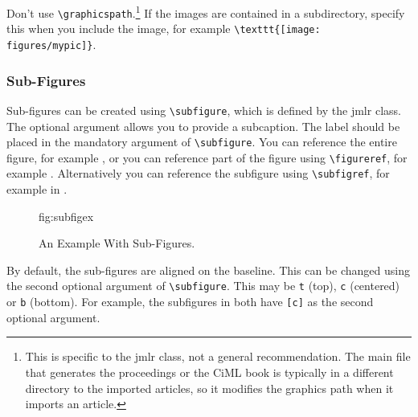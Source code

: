 \documentclass[pmlr,twocolumn,10pt]{jmlr} %
\begin{document}
Don't use \verb|\graphicspath|.\footnote{This is specific to the
\textsf{jmlr} class, not a general recommendation. The main file
that generates the proceedings or the CiML book is typically in a
different directory to the imported articles, so it modifies the
graphics path when it imports an article.} If the images 
are contained in a subdirectory, specify this when you include the image, for
example \verb|\texttt{[image: figures/mypic]}|.

\subsubsection{Sub-Figures}
\label{sec:subfigures}

Sub-figures can be created using \verb|\subfigure|, which is
defined by the \textsf{jmlr} class. The optional argument allows
you to provide a subcaption. The label should be placed in the
mandatory argument of \verb|\subfigure|. You can reference the
entire figure, for example , or you can
reference part of the figure using \verb|\figureref|, for example
. Alternatively you can reference the
subfigure using \verb|\subfigref|, for example
 in .

\begin{figure}[htbp]
\floatconts
  {fig:subfigex}
  {\caption{An Example With Sub-Figures.}}
  {%
    \qquad
  }
\end{figure}

By default, the sub-figures are aligned on the baseline.
This can be changed using the second optional argument
of \verb|\subfigure|. This may be \texttt{t} (top), \texttt{c}
(centered) or \texttt{b} (bottom). For example, the subfigures
 in 
both have \verb|[c]| as the second optional argument.
\end{document}
